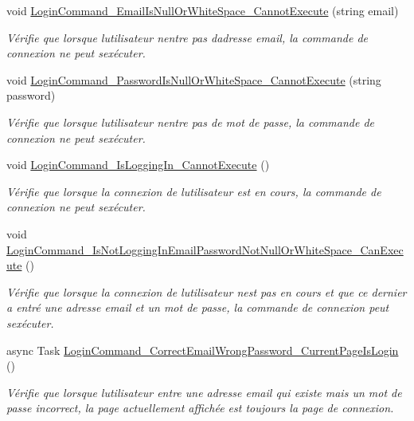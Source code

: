 \begin{DoxyCompactItemize}
void \hyperlink{class_boxes_1_1_tests_1_1_login_view_model_tests_a1a1911464b163f9ab6b397dced5de134}{Login\+Command\+\_\+\+Email\+Is\+Null\+Or\+White\+Space\+\_\+\+Cannot\+Execute} (string email)
\begin{DoxyCompactList}\small\item\em Vérifie que lorsque l\textquotesingle{}utilisateur n\textquotesingle{}entre pas d\textquotesingle{}adresse email, la commande de connexion ne peut s\textquotesingle{}exécuter. \end{DoxyCompactList}\item 
void \hyperlink{class_boxes_1_1_tests_1_1_login_view_model_tests_a04afc4b49a9c2877a36dbecadf8c28be}{Login\+Command\+\_\+\+Password\+Is\+Null\+Or\+White\+Space\+\_\+\+Cannot\+Execute} (string password)
\begin{DoxyCompactList}\small\item\em Vérifie que lorsque l\textquotesingle{}utilisateur n\textquotesingle{}entre pas de mot de passe, la commande de connexion ne peut s\textquotesingle{}exécuter. \end{DoxyCompactList}\item 
void \hyperlink{class_boxes_1_1_tests_1_1_login_view_model_tests_aee9eda2825bf6e1f0fd3476c75482672}{Login\+Command\+\_\+\+Is\+Logging\+In\+\_\+\+Cannot\+Execute} ()
\begin{DoxyCompactList}\small\item\em Vérifie que lorsque la connexion de l\textquotesingle{}utilisateur est en cours, la commande de connexion ne peut s\textquotesingle{}exécuter. \end{DoxyCompactList}\item 
void \hyperlink{class_boxes_1_1_tests_1_1_login_view_model_tests_a28a278906bde25013a2f138046a63981}{Login\+Command\+\_\+\+Is\+Not\+Logging\+In\+Email\+Password\+Not\+Null\+Or\+White\+Space\+\_\+\+Can\+Execute} ()
\begin{DoxyCompactList}\small\item\em Vérifie que lorsque la connexion de l\textquotesingle{}utilisateur n\textquotesingle{}est pas en cours et que ce dernier a entré une adresse email et un mot de passe, la commande de connexion peut s\textquotesingle{}exécuter. \end{DoxyCompactList}\item 
async Task \hyperlink{class_boxes_1_1_tests_1_1_login_view_model_tests_aa4e2393650da2c3def7375d8dac4b061}{Login\+Command\+\_\+\+Correct\+Email\+Wrong\+Password\+\_\+\+Current\+Page\+Is\+Login} ()
\begin{DoxyCompactList}\small\item\em Vérifie que lorsque l\textquotesingle{}utilisateur entre une adresse email qui existe mais un mot de passe incorrect, la page actuellement affichée est toujours la page de connexion. \end{DoxyCompactList}\item 

\end{DoxyCompactItemize}
